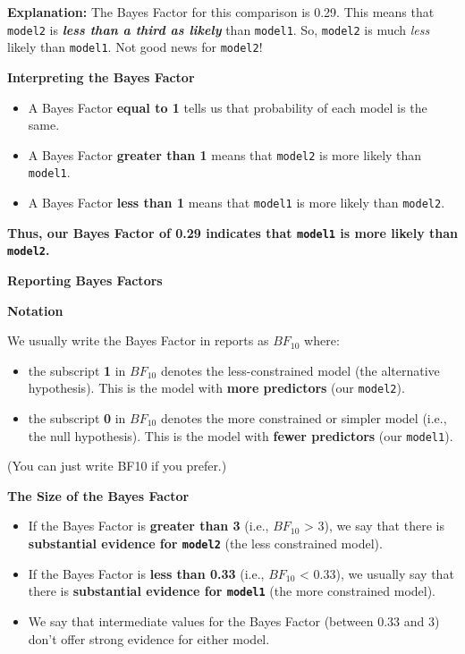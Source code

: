 \documentclass[
]{book}
\theoremstyle{definition}
\theoremstyle{definition}
\theoremstyle{definition}
\theoremstyle{definition}
\theoremstyle{remark}
\begin{document}
\textbf{Explanation:} The Bayes Factor for this comparison is 0.29. This means that \texttt{model2} is \textbf{\emph{less than a third as likely}} than \texttt{model1}. So, \texttt{model2} is much \emph{less} likely than \texttt{model1}. Not good news for \texttt{model2}!

\textbf{Interpreting the Bayes Factor}

\begin{itemize}
\item
  A Bayes Factor \textbf{equal to 1} tells us that probability of each model is the same.
\item
  A Bayes Factor \textbf{greater than 1} means that \texttt{model2} is more likely than \texttt{model1}.
\item
  A Bayes Factor \textbf{less than 1} means that \texttt{model1} is more likely than \texttt{model2}.
\end{itemize}

\textbf{Thus, our Bayes Factor of 0.29 indicates that \texttt{model1} is more likely than \texttt{model2}.}

\textbf{Reporting Bayes Factors}

\hfill\break

\textbf{Notation}

We usually write the Bayes Factor in reports as \(BF_{10}\) where:

\begin{itemize}
\item
  the subscript \textbf{1} in \(BF_{10}\) denotes the less-constrained model (the alternative hypothesis). This is the model with \textbf{more predictors} (our \texttt{model2}).
\item
  the subscript \textbf{0} in \(BF_{10}\) denotes the more constrained or simpler model (i.e., the null hypothesis). This is the model with \textbf{fewer predictors} (our \texttt{model1}).
\end{itemize}

(You can just write BF10 if you prefer.)

\hfill\break

\textbf{The Size of the Bayes Factor}

\begin{itemize}
\item
  If the Bayes Factor is \textbf{greater than 3} (i.e., \(BF_{10}\) \textgreater{} 3), we say that there is \textbf{substantial evidence for \texttt{model2}} (the less constrained model).
\item
  If the Bayes Factor is \textbf{less than 0.33} (i.e., \(BF_{10}\) \textless{} 0.33), we usually say that there is \textbf{substantial evidence for \texttt{model1}} (the more constrained model).
\item
  We say that intermediate values for the Bayes Factor (between 0.33 and 3) don't offer strong evidence for either model.
\end{itemize}
\end{document}
